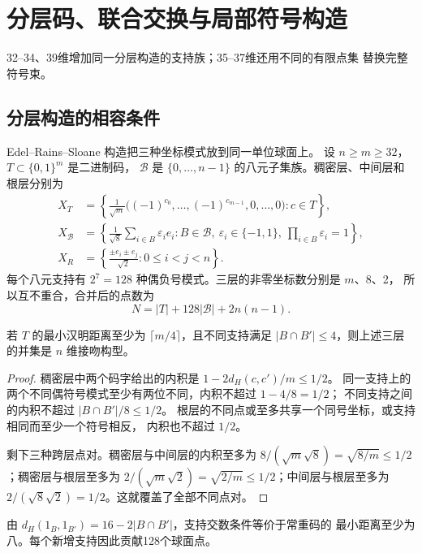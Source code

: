 \section{分层码、联合交换与局部符号构造}
\label{sec:codes}

32--34、39维增加同一分层构造的支持族；35--37维还用不同的有限点集
替换完整符号束。

\subsection{分层构造的相容条件}

Edel--Rains--Sloane 构造\cite{ers}把三种坐标模式放到同一单位球面上。
设 $n\ge m\ge32$，$T\subset\{0,1\}^m$ 是二进制码，
$\mathcal B$ 是 $\{0,\ldots,n-1\}$ 的八元子集族。稠密层、中间层和根层分别为
\begin{align*}
X_T&=\left\{\frac{1}{\sqrt m}
 \bigl((-1)^{c_0},\ldots,(-1)^{c_{m-1}},0,\ldots,0\bigr):c\in T\right\},\\
X_{\mathcal B}&=\left\{\frac{1}{\sqrt8}\sum_{i\in B}\varepsilon_i e_i:
 B\in\mathcal B,\ \varepsilon_i\in\{-1,1\},\ \prod_{i\in B}\varepsilon_i=1\right\},\\
X_R&=\left\{\frac{\pm e_i\pm e_j}{\sqrt2}:0\le i<j<n\right\}.
\end{align*}
每个八元支持有 $2^7=128$ 种偶负号模式。三层的非零坐标数分别是 $m$、8、2，
所以互不重合，合并后的点数为
\begin{equation}
N=|T|+128|\mathcal B|+2n(n-1).
\label{eq:ers-count}
\end{equation}

\begin{proposition}
\label{prop:ers}
若 $T$ 的最小汉明距离至少为 $\lceil m/4\rceil$，且不同支持满足
$|B\cap B'|\le4$，则上述三层的并集是 $n$ 维接吻构型。
\end{proposition}
\begin{proof}
稠密层中两个码字给出的内积是 $1-2d_H(c,c')/m\le1/2$。
同一支持上的两个不同偶符号模式至少有两位不同，内积不超过 $1-4/8=1/2$；
不同支持之间的内积不超过 $|B\cap B'|/8\le1/2$。
根层的不同点或至多共享一个同号坐标，或支持相同而至少一个符号相反，
内积也不超过 $1/2$。

剩下三种跨层点对。稠密层与中间层的内积至多为
$8/(\sqrt m\sqrt8)=\sqrt{8/m}\le1/2$；稠密层与根层至多为
$2/(\sqrt m\sqrt2)=\sqrt{2/m}\le1/2$；中间层与根层至多为
$2/(\sqrt8\sqrt2)=1/2$。这就覆盖了全部不同点对。
\end{proof}

由 $d_H(1_B,1_{B'})=16-2|B\cap B'|$，支持交数条件等价于常重码的
最小距离至少为八。每个新增支持因此贡献128个球面点\cite{bsss,brouwer,echols}。

